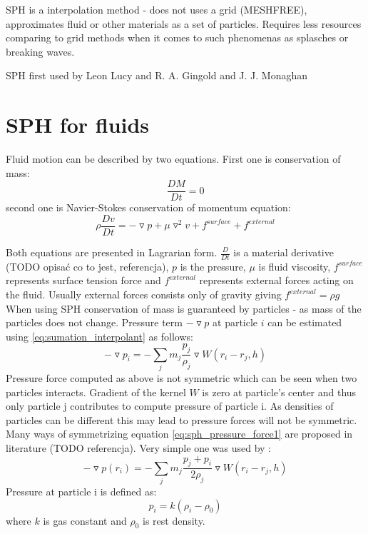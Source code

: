SPH is a interpolation method - does not uses a grid (MESHFREE), approximates fluid or other materials as a set of particles. Requires less resources comparing to grid methods when it comes to such phenomenas as splasches or breaking waves. 

SPH first used by Leon Lucy and R. A. Gingold and J. J. Monaghan

\section{SPH for fluids}
Fluid motion can be described by two equations. First one is conservation of mass:
\begin{equation}
\label{eq:mass_conservation}
\frac{DM}{Dt} = 0
\end{equation}
second one is Navier-Stokes conservation of momentum equation:
\begin{equation}
\label{eq:momentum_conservation}
\rho \frac{Dv}{Dt} = -\triangledown p + \mu \triangledown^2v + f^{surface} +  f^{external}
\end{equation}

Both equations are presented in Lagrarian form. $\frac{D}{Dt}$ is a material derivative (TODO opisać co to jest, referencja), $p$ is the pressure, $\mu$ is fluid viscosity, $f^{surface}$ represents surface tension force and $f^{external}$ represents external forces acting on the fluid. Usually external forces consists only of gravity giving $f^{external} = \rho g$
When using SPH conservation of mass is guaranteed by particles - as mass of the particles does not change. 
Pressure term $-\triangledown p$  at particle $i$ can be estimated using \ref{eq:sumation_interpolant} as follows:
\begin{equation}
\label{eq:sph_pressure_force1}
-\triangledown p_i = -\sum_{j}m_j \frac{p_j}{\rho_j}\triangledown W(r_i - r_j, h) 
\end{equation}
Pressure force computed as above is not symmetric which can be seen when two particles interacts. Gradient of the kernel $W$ is zero at particle's center and thus only particle j contributes to compute pressure of particle i. As densities of particles can be different this may lead to pressure forces will not be symmetric. Many ways of symmetrizing equation \ref{eq:sph_pressure_force1} are proposed in literature (TODO referencja). Very simple one was used by \cite{Muller2003}:
\begin{equation}
\label{eq:sph_pressure_force_muller}
-\triangledown p(r_i) = -\sum_{j}m_j \frac{p_j + p_i}{2\rho_j}\triangledown W(r_i - r_j, h) 
\end{equation}
Pressure at particle i is defined as:
\begin{equation}
\label{eq:pressure}
p_i = k(\rho_i - \rho_0)
\end{equation}
where $k$ is gas constant and $\rho_0$ is rest density.

